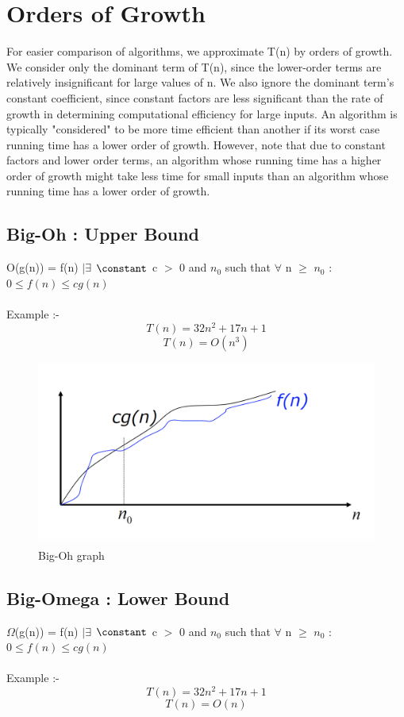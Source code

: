 \section{Orders of Growth}
For easier comparison of algorithms, we approximate T(n) by orders of growth. We consider only the dominant term of T(n), since the lower-order terms are relatively insignificant for large values of n. We also ignore the dominant term's constant coefficient, since constant factors are less significant than the rate of growth in determining computational efficiency for large inputs. An algorithm is typically "considered" to be more time efficient than another if its worst case
running time has a lower order of growth. However, note that due to constant factors and lower order terms, an algorithm whose running time has a higher order of growth might take less time for small inputs than an algorithm whose running time has a lower order of growth.

\subsection{Big-Oh : Upper Bound}
O(g(n)) = { f(n) $| \exists$ $\constant$ c $>$ 0 and $n_0$ such that $\forall$ n $\geq$ $n_0$ : $0 \leq f(n) \leq cg(n)$ }
\\\\Example :-
\[ T(n) = 32n^2 + 17n + 1 \]
\[ T(n) = O(n^3) \]

\begin{figure}[H]
\centering
\includegraphics[scale=0.6]{figures/MDS5.png}
\caption{Big-Oh graph}
    \label{fig:example_figure}
\end{figure}

\subsection{Big-Omega : Lower Bound}
$\Omega$(g(n)) = { f(n) $| \exists$ $\constant$ c $>$ 0 and $n_0$ such that $\forall$ n $\geq$ $n_0$ : $0 \leq f(n) \leq cg(n)$ }
\\\\Example :-
\[ T(n) = 32n^2 + 17n + 1 \]
\[ T(n) = O(n) \]

